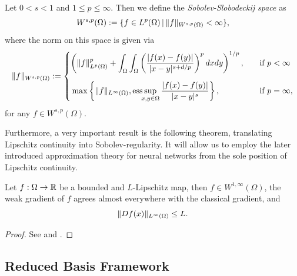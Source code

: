 \begin{definition}
    Let $0 < s < 1$ and $1 \leq p \leq \infty$. Then we define the \emph{Sobolev-Slobodeckij space} as
    \begin{equation*}
        W^{s, p}(\Omega) := \{ f \in L^p(\Omega) \, \vert \, \lVert f \rVert_{W^{s, p}(\Omega)} < \infty \},
    \end{equation*}
    where the norm on this space is given via
    \begin{equation*}
        \lVert f \rVert_{W^{s, p}(\Omega)} := \begin{cases}
            \displaystyle
            \left( \lVert f \rVert_{L^p(\Omega)}^p + \int_\Omega \int_\Omega 
            \left( \frac{\vert f(x) - f(y) \vert}{\vert x-y \vert^{s + d/p}}\right)^p dx dy \right)^{1/p}, 
            \quad &\text{if } p<\infty \\[1.5em]
            \displaystyle
            \, \max \left\{\lVert f \rVert_{L^\infty(\Omega)}, \operatorname{ess} \!\! \sup_{x, y \in \Omega} 
            \frac{\vert f(x)-f(y) \vert}{\vert x-y \vert^{s}} \right\}, \quad &\text{if } p = \infty,
        \end{cases}
    \end{equation*}
    for any $f \in W^{s, p}(\Omega)$.
\end{definition}

Furthermore, a very important result is the following theorem, translating Lipschitz continuity into
Sobolev-regularity. It will allow us to employ the later introduced approximation theory for neural networks
from the sole position of Lipschitz continuity.

\begin{theorem} \label{theo: lipschitz implies sobolev}
    Let $f: \Omega \to \mathbb{R}$ be a bounded and $L$-Lipschitz map, then $f \in W^{1, \infty}(\Omega)$, the 
    weak gradient of $f$ agrees almost everywhere with the classical gradient, and
    \begin{equation*}
        \lVert D f(x) \rVert_{L^{\infty}(\Omega)} \leq L.
    \end{equation*}
\end{theorem}
\begin{proof}
    See \cite[Theorem 4.1]{heinonen2005} and \cite[Remark 4.2]{heinonen2005}.
\end{proof}




\subsection{Reduced Basis Framework}  \label{subsec: reduced basis framework}


